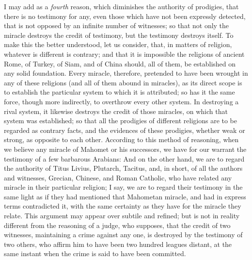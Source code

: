 \documentclass[]{article}
\begin{document}
\begin{sectionbody}
\humeparagraph  I may add as a \emph{fourth} reason, which diminishes the authority of prodigies, that there is no testimony for any, even those which have not been expressly detected, that is not opposed by an infinite number of witnesses; so that not only the miracle destroys the credit of testimony, but the testimony destroys itself. To make this the better understood, let us consider, that, in matters of religion, whatever is different is contrary; and that it is impossible the religions of ancient Rome, of Turkey, of Siam, and of China should, all of them, be established on any solid foundation. Every miracle, therefore, pretended to have been wrought in any of these religions (and all of them abound in miracles), as its direct scope is to establish the particular system to which it is attributed; so has it the same force, though more indirectly, to overthrow every other system. In destroying a rival system, it likewise destroys the credit of those miracles, on which that system was established; so that all the prodigies of different religions are to be regarded as contrary facts, and the evidences of these prodigies, whether weak or strong, as opposite to each other. According to this method of reasoning, when we believe any miracle of Mahomet or his successors, we have for our warrant the testimony of a few barbarous Arabians: And on the other hand, we are to regard the authority of Titus Livius, Plutarch, Tacitus, and, in short, of all the authors and witnesses, Grecian, Chinese, and Roman Catholic, who have related any miracle in their particular religion; I say, we are to regard their testimony in the same light as if they had mentioned that Mahometan miracle, and had in express terms contradicted it, with the same certainty as they have for the miracle they relate. This argument may appear over subtile and refined; but is not in reality different from the reasoning of a judge, who supposes, that the credit of two witnesses, maintaining a crime against any one, is destroyed by the testimony of two others, who affirm him to have been two hundred leagues distant, at the same instant when the crime is said to have been committed.


\end{sectionbody}
\end{document}
